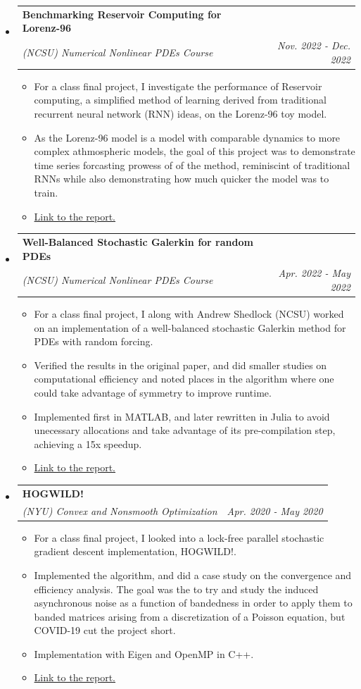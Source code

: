 \documentclass[letterpaper,11pt]{article}
\makeatletter
\newlength{\outerbordwidth}
\newcommand{\resitem}[1]{\item #1 \vspace{-2pt}}
\newcommand{\resheading}[1]{\vspace{8pt}
  \parbox{\textwidth}{\setlength{\FrameSep}{\outerbordwidth}
    \begin{shaded}

\setlength{\fboxsep}{0pt}\framebox[\textwidth][l]{\setlength{\fboxsep}{4pt}\fcolorbox{shadecolorB}{shadecolorB}{\textbf{\sffamily{\mbox{~}\makebox[6.762in][l]{\large #1} \vphantom{p\^{E}}}}}}
    \end{shaded}
  }\vspace{-5pt}
}
\newcommand{\ressubheading}[4]{
\begin{tabular*}{6.5in}{l@{\cftdotfill{\cftsecdotsep}\extracolsep{\fill}}r}
		\textbf{#1} & #2 \\
		\textit{#3} & \textit{#4} \\
\end{tabular*}\vspace{-6pt}}
\makeatother
\begin{document}
\resheading{Projects}
\begin{itemize}

\item
  \ressubheading{Benchmarking Reservoir Computing for Lorenz-96}{}{(NCSU)
  Numerical Nonlinear PDEs Course}{Nov. 2022 - Dec. 2022}
  \begin{itemize}
    \resitem{
      For a class final project, I investigate the performance of Reservoir
      computing, a simplified method of learning derived from traditional
      recurrent neural network (RNN) ideas, on the Lorenz-96 toy model.
    }
    \resitem{
      As the Lorenz-96 model is a model with comparable dynamics to more complex
      athmospheric models, the goal of this project was to demonstrate time
      series forcasting prowess of of the method, reminiscint of traditional
      RNNs while also demonstrating how much quicker the model was to train.
    }
    \resitem{\href{https://abhijit-c.github.io/files/ddm-final.pdf}{Link
    to the report.}}
  \end{itemize}

\item
  \ressubheading{Well-Balanced Stochastic Galerkin for random PDEs}{}{(NCSU)
  Numerical Nonlinear PDEs Course}{Apr. 2022 - May 2022}
  \begin{itemize}
    \resitem{
      For a class final project, I along with Andrew Shedlock (NCSU) worked on
      an implementation of a well-balanced stochastic Galerkin method for PDEs
      with random forcing.
    }
    \resitem{
        Verified the results in the original paper, and did smaller studies on
        computational efficiency and noted places in the algorithm where one
        could take advantage of symmetry to improve runtime.
    }
    \resitem{
      Implemented first in MATLAB, and later rewritten in Julia to avoid
      unecessary allocations and take advantage of its pre-compilation step,
      achieving a 15x speedup.
    }
    \resitem{\href{https://abhijit-c.github.io/files/WBSG-Report.pdf}{Link
    to the report.}}
  \end{itemize}

\item
  \ressubheading{HOGWILD!}{}{(NYU) Convex and Nonsmooth Optimization}{Apr. 2020 - May 2020}
	\begin{itemize}
    \resitem{
      For a class final project, I looked into a lock-free parallel stochastic
      gradient descent implementation, {\rm HOGWILD!}.
    }
    \resitem{
      Implemented the algorithm, and did a case study on the convergence and
      efficiency analysis. The goal was the to try and study the induced
      asynchronous noise as a function of bandedness in order to apply them to
      banded matrices arising from a discretization of a Poisson equation, but
      COVID-19 cut the project short.
    }
    \resitem{Implementation with Eigen and OpenMP in C++.}
    \resitem{\href{https://abhijit-c.github.io/files/Hogwild.pdf}{Link
    to the report.}}
	\end{itemize}




\end{itemize}
\end{document}
